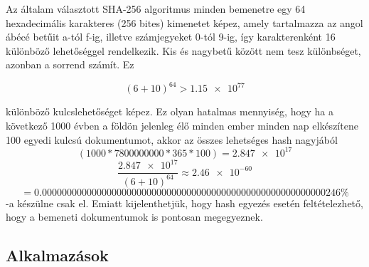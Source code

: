 Az általam választott SHA-256 algoritmus \cite{gueron2011sha} minden bemenetre egy 64 hexadecimális karakteres (256 bites) kimenetet képez, amely tartalmazza az angol ábécé betűit a-tól f-ig, illetve számjegyeket 0-tól 9-ig, így karakterenként 16 különböző lehetőséggel rendelkezik. Kis és nagybetű között nem tesz különbséget, azonban a sorrend számít. Ez
%
{\hfil $$ (6 + 10)^{64} > \num{1.15e77} $$ \par}
%
különböző kulcslehetőséget képez. Ez olyan hatalmas mennyiség, hogy ha a következő 1000 évben a földön jelenleg élő minden ember minden nap elkészítene 100 egyedi kulcsú dokumentumot, akkor az összes lehetséges hash nagyjából 
%
\begin{equation}
    (1000 * \num{7800000000} * 365 * 100) = \num{2.847e17}
\end{equation}
\begin{equation}
    \frac{\num{2.847e17}}{(6 + 10)^{64}} \approx \num{2.46e-60}
\end{equation}
\begin{equation}
     = 0.000000000000000000000000000000000000000000000000000000000246 \%
\end{equation}
%
-a készülne csak el. Emiatt kijelenthetjük, hogy hash egyezés esetén feltételezhető, hogy a bemeneti dokumentumok is pontosan megegyeznek.


\subsection{Alkalmazások}

